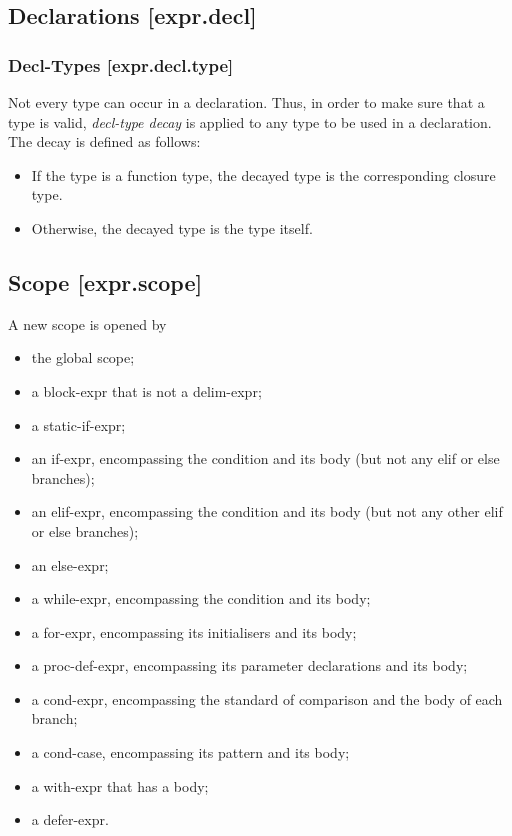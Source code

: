 \documentclass[a4paper, 12pt, oneside, final]{article}
\begin{document}
\subsection{Declarations [expr.decl]}
\subsubsection{Decl-Types [expr.decl.type]}
Not every type can occur in a declaration. Thus, in order to make sure that a type is valid, \emph{decl-type decay}
is applied to any type to be used in a declaration. The decay is defined as follows:
\begin{itemize}
\item If the type is a function type, the decayed type is the corresponding closure type.
\item Otherwise, the decayed type is the type itself.
\end{itemize}

\subsection{Scope [expr.scope]}
A new scope is opened by
\begin{itemize}
\item the global scope;
\item a block-expr that is not a delim-expr;
\item a static-if-expr;
\item an if-expr, encompassing the condition and its body (but not any elif or else branches);
\item an elif-expr, encompassing the condition and its body (but not any other elif or else branches);
\item an else-expr;
\item a while-expr, encompassing the condition and its body;
\item a for-expr, encompassing its initialisers and its body;
\item a proc-def-expr, encompassing its parameter declarations and its body;
\item a cond-expr, encompassing the standard of comparison and the body of each branch;
\item a cond-case, encompassing its pattern and its body;
\item a with-expr that has a body;
\item a defer-expr.
\end{itemize}
\end{document}
